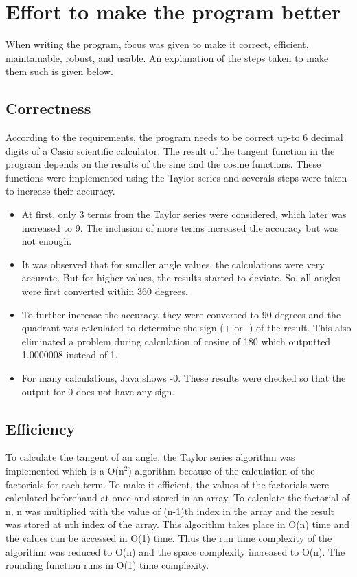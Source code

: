 \documentclass[paper=a4, fontsize=11pt,twoside]{scrartcl}	%
\begin{document}
    \section{Effort to make the program better}
    When writing the program, focus was given to make it correct, efficient, maintainable, robust, and usable. An explanation of the steps taken to make them such is given below.
    \subsection{Correctness}
    According to the requirements, the program needs to be correct up-to 6 decimal digits of a Casio scientific calculator. The result of the tangent function in the program depends on the results of the sine and the cosine functions. These functions were implemented using the Taylor series and severals steps were taken to increase their accuracy. 
    \begin{itemize}
        \item At first, only 3 terms from the Taylor series were considered, which later was increased to 9. The inclusion of more terms  increased the accuracy but was not enough.
        \item It was observed that for smaller angle values, the calculations were very accurate. But for higher values, the results started to deviate. So, all angles were first converted within 360 degrees. 
        \item To further increase the accuracy, they were converted to 90 degrees and the quadrant was calculated to determine the sign (+ or -) of the result. This also eliminated a problem during calculation of cosine of 180 which outputted 1.0000008 instead of 1.
        \item For many calculations, Java shows -0. These results were checked so that the output for 0 does not have any sign.
    \end{itemize}
    \subsection{Efficiency}
    To calculate the tangent of an angle, the Taylor series algorithm was implemented which is a O(n$^2$) algorithm because of the calculation of the factorials for each term. To make it efficient, the values of the factorials were calculated beforehand at once and stored in an array. To calculate the factorial of n, n was multiplied with the value of (n-1)th index in the array and the result was stored at nth index of the array. This algorithm takes place in O(n) time and the values can be accessed in O(1) time. Thus the run time complexity of the algorithm was reduced to O(n) and the space complexity increased to O(n). The rounding function runs in O(1) time complexity.
\end{document}
